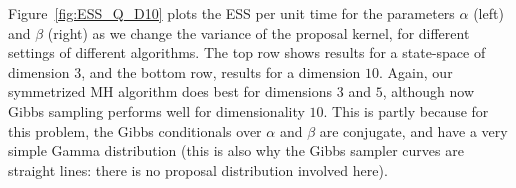   Figure~\ref{fig:ESS_Q_D10} plots the ESS 
  per unit time for the parameters $\alpha$ (left) and $\beta$ (right) as we 
  change the variance of the proposal kernel, for different settings of
  different algorithms. The top row shows results for a state-space
  of dimension $3$, and the bottom row, results for a dimension
  $10$.
  Again, our symmetrized  MH algorithm does best for dimensions
  $3$ and $5$, although now Gibbs sampling performs well for dimensionality $10$.
  This is partly because for this problem, the Gibbs conditionals over $\alpha$
  and $\beta$ are conjugate, and have a very simple Gamma distribution
  (this is also why the Gibbs sampler curves are straight lines: there is no
  proposal distribution involved here).
